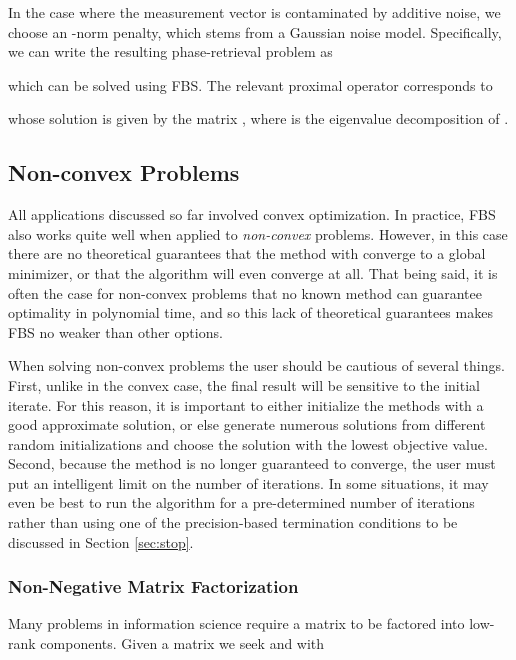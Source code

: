 \documentclass{amsart}
\newcommand{\eqn}[2]{}
\newcommand{\st}{\hbox{ \,\,subject to\,\, }}
\newcommand{\mcA}{\mathcal{A}}
\DeclareMathOperator*{\minimize}{minimize\quad}
\theoremstyle{definition}
\begin{document}
In the case where the measurement vector  is contaminated by additive noise, we choose an  -norm penalty, which stems from a Gaussian noise model. Specifically, we can write the resulting phase-retrieval problem as
        \eqn{smoothRankMin}{ 
          \minimize \!\!\! \mu\|X\|_* +\|\mcA(X) - b\|^2 \, \st  X\succeq 0, \notag
          }
which can be solved using FBS.  The relevant proximal operator corresponds to

whose solution is given by the matrix , where   is the eigenvalue decomposition of .

\subsection{Non-convex Problems}
All applications discussed so far involved convex optimization.  In practice, FBS also works quite well when applied to {\em non-convex} problems.  However, in this case there are no theoretical guarantees that the method with converge to a global minimizer, or that the algorithm will even converge at all.   That being said, it is often the case for non-convex problems that no known method can guarantee optimality in polynomial time, and so this lack of theoretical guarantees makes FBS no weaker than other options.  

  When solving non-convex problems the user should be cautious of several things.  First, unlike in the convex case, the final result will be sensitive to the initial iterate.  For this reason, it is important to either initialize the methods with a good approximate solution, or else generate numerous solutions from different random initializations and choose the solution with the lowest objective value.    Second, because the method is no longer guaranteed to converge, the user must put an intelligent limit on the number of iterations.  In some situations, it may even be best to run the algorithm for a pre-determined number of iterations rather than using one of the precision-based termination conditions to be discussed in Section \ref{sec:stop}.

\subsubsection{Non-Negative Matrix Factorization}
Many problems in information science require a matrix to be factored into low-rank components.  Given a matrix  we seek  and  with 
  
\end{document}
